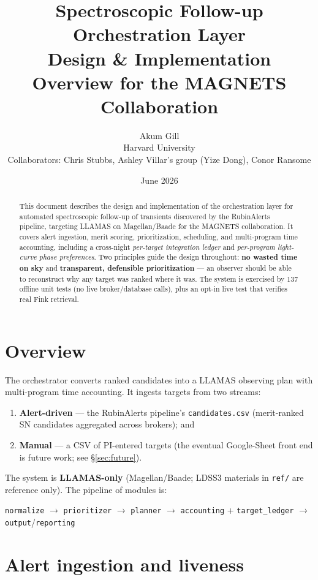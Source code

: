 \documentclass[11pt,letterpaper]{article}
\title{Spectroscopic Follow-up Orchestration Layer\\[0.5em]
\large Design \& Implementation Overview for the MAGNETS Collaboration}
\author{Akum Gill\\
\small Harvard University\\
\small Collaborators: Chris Stubbs, Ashley Villar's group (Yize Dong), Conor Ransome}
\date{June 2026}
\begin{document}
\maketitle

\begin{abstract}
This document describes the design and implementation of the orchestration layer for
automated spectroscopic follow-up of transients discovered by the RubinAlerts pipeline,
targeting LLAMAS on Magellan/Baade for the MAGNETS collaboration. It covers alert ingestion,
merit scoring, prioritization, scheduling, and multi-program time accounting, including a
cross-night \emph{per-target integration ledger} and \emph{per-program light-curve phase
preferences}. Two principles guide the design throughout: \textbf{no wasted time on sky} and
\textbf{transparent, defensible prioritization} --- an observer should be able to reconstruct
why any target was ranked where it was. The system is exercised by 137 offline unit tests (no
live broker/database calls), plus an opt-in live test that verifies real Fink retrieval.
\end{abstract}

\tableofcontents
\newpage

\section{Overview}
The orchestrator converts ranked candidates into a LLAMAS observing plan with multi-program
time accounting. It ingests targets from two streams:
\begin{enumerate}[nosep]
  \item \textbf{Alert-driven} --- the RubinAlerts pipeline's \texttt{candidates.csv}
  (merit-ranked SN candidates aggregated across brokers); and
  \item \textbf{Manual} --- a CSV of PI-entered targets (the eventual Google-Sheet front
  end is future work; see \S\ref{sec:future}).
\end{enumerate}
The system is \textbf{LLAMAS-only} (Magellan/Baade; LDSS3 materials in \texttt{ref/} are
reference only). The pipeline of modules is:
\begin{center}
\texttt{normalize} $\rightarrow$ \texttt{prioritizer} $\rightarrow$ \texttt{planner}
$\rightarrow$ \texttt{accounting} + \texttt{target\_ledger} $\rightarrow$ \texttt{output}/\texttt{reporting}
\end{center}

\section{Alert ingestion and liveness}
\end{document}
